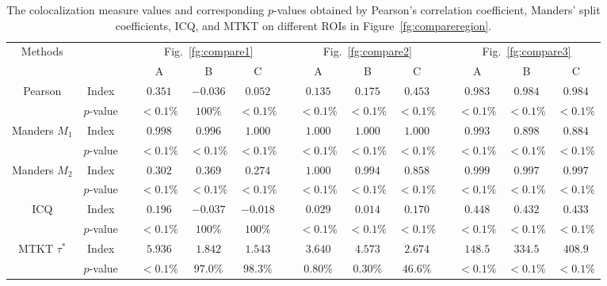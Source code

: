 \documentclass[10pt,twocolumn,twoside]{IEEEtran}
\begin{document}
\begingroup
\renewcommand{\arraystretch}{1.5}
\begin{table*}[h!]
\centering
\begin{tabular}{c c c c c c c c c c c c c c}
\hline
\hline
\multirow{2}{*}{Methods} & & & \multicolumn{3}{c}{Fig.~\ref{fg:compare1}} & & \multicolumn{3}{c}{Fig.~\ref{fg:compare2}} & &  \multicolumn{3}{c}{Fig.~\ref{fg:compare3}}\\
 \cline{4-6}   \cline{8-10}  \cline{12-14} 
& & & A & B & C & & A & B & C & & A & B & C \\
\hline
\multirow{2}{*}{Pearson } &  Index &      & $0.351$ &  $-0.036$ & $0.052$ & & $0.135$ & $0.175$ & $0.453$ & & $0.983$ & $0.984$ & $0.984$\\ 
& $p$-value & & $<0.1\%$ & $100\%$ & $<0.1\%$ & & $<0.1\%$ & $<0.1\%$ & $<0.1\%$ & & $<0.1\%$ & $<0.1\%$  & $<0.1\%$  \\
\hline
\multirow{2}{*}{Manders $M_1$ } &  Index &      & $0.998$ &  $0.996$ & $1.000$ & & $1.000$ & $1.000$ & $1.000$ & & $0.993$ & $0.898$ & $0.884$\\ 
& $p$-value & & $<0.1\%$ & $<0.1\%$ & $<0.1\%$ & & $<0.1\%$ & $<0.1\%$ & $<0.1\%$ & & $<0.1\%$ & $<0.1\%$  & $<0.1\%$  \\
\hline
\multirow{2}{*}{Manders $M_2$ } &  Index &      & $0.302$ &  $0.369$ & $0.274$ & & $1.000$ & $0.994$ & $0.858$ & & $0.999$ & $0.997$ & $0.997$\\ 
& $p$-value & & $<0.1\%$ & $<0.1\%$ & $<0.1\%$ & & $<0.1\%$ & $<0.1\%$ & $<0.1\%$ & & $<0.1\%$ & $<0.1\%$  & $<0.1\%$  \\
\hline
\multirow{2}{*}{ICQ } &  Index &      & $0.196$ &  $-0.037$ & $-0.018$ & & $0.029$ & $0.014$ & $0.170$ & & $0.448$ & $0.432$ & $0.433$\\ 
& $p$-value & & $<0.1\%$ & $100\%$ & $100\%$ & & $<0.1\%$ & $<0.1\%$ & $<0.1\%$ & & $<0.1\%$ & $<0.1\%$  & $<0.1\%$  \\
\hline
\multirow{2}{*}{MTKT $\tau^\ast$  } &  Index &      & $5.936$ &  $1.842$ & $1.543$ & & $3.640$ & $4.573$ & $2.674$ & & $148.5$ & $334.5$ & $408.9$\\ 
& $p$-value & & $<0.1\%$ & $97.0\%$ & $98.3\%$ & & $0.80\%$ & $0.30\%$ & $46.6\%$ & & $<0.1\%$ & $<0.1\%$  & $<0.1\%$  \\ 
\hline
\hline
\end{tabular}
\caption{The colocalization measure values and corresponding $p$-values obtained by Pearson's correlation coefficient, Manders' split coefficients, ICQ, and MTKT on different ROIs in Figure~\ref{fg:compareregion}.}\label{tb:comparison}
\end{table*}
\endgroup
\end{document}
